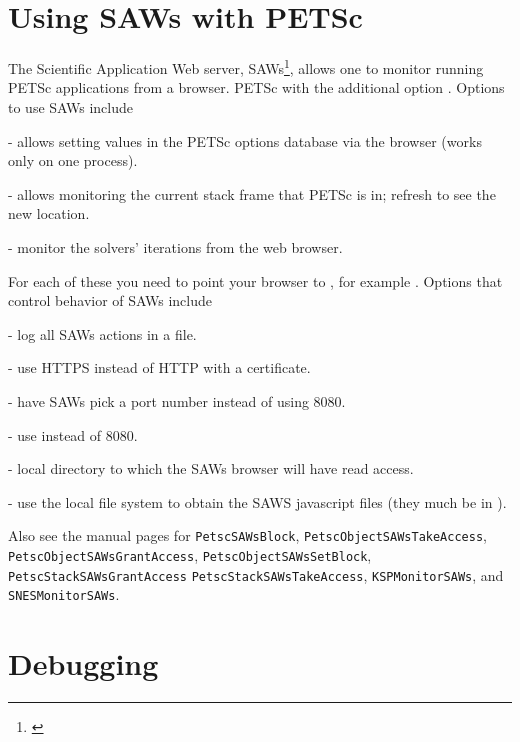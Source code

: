{{{\section{Using SAWs with PETSc} \label{sec_saws}
The Scientific Application Web server, 
SAWs\footnote{\href{https://bitbucket.org/saws/saws/wiki/Home}{}},
allows one to monitor running PETSc applications from a browser.
 PETSc with the additional option . 
Options to use SAWs include
\begin{tightitemize}
  \item{} - allows setting values in the PETSc options database via the browser (works only on one process).
  \item{} - allows monitoring the current stack frame that PETSc is in; refresh to see the new location.
  \item{} - monitor the solvers' iterations from the web browser.
\end{tightitemize}
For each of these you need to point your browser to , for example .
Options that control behavior of SAWs include
\begin{tightitemize}
  \item{} - log all SAWs actions in a file.
  \item{} - use HTTPS instead of HTTP with a certificate.
  \item{} - have SAWs pick a port number instead of using 8080.
  \item{} - use  instead of 8080.
  \item{} - local directory to which the SAWs browser will have read access.
  \item{} - use the local file system to obtain the SAWS javascript files (they much be in ).
\end{tightitemize}
Also see the manual pages for \lstinline{PetscSAWsBlock}, \lstinline{PetscObjectSAWsTakeAccess},
\lstinline{PetscObjectSAWsGrantAccess}, \lstinline{PetscObjectSAWsSetBlock}, \lstinline{PetscStackSAWsGrantAccess}
\lstinline{PetscStackSAWsTakeAccess}, \lstinline{KSPMonitorSAWs}, and \lstinline{SNESMonitorSAWs}.

\section{Debugging}  \label{sec_debugging}

}}}
